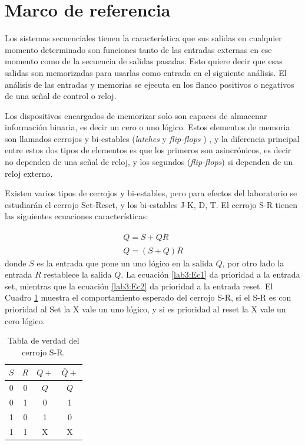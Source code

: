 \section{Marco de referencia}

 Los sistemas secuenciales tienen la característica que sus salidas en cualquier momento determinado son funciones tanto de las entradas externas en ese momento como de la secuencia de salidas pasadas. Esto quiere decir que esas salidas son memorizadas para usarlas como entrada en el siguiente análisis. El análisis de las entradas y memorias se ejecuta en los flanco positivos o negativos de una señal de control o reloj.
 
 Los dispositivos encargados de memorizar solo son capaces de almacenar información binaria, es decir un cero o uno lógico. Estos elementos de memoria son llamados cerrojos y bi-estables (\textit{latches} y \textit{flip-flops} ) , y la diferencia principal entre estos dos tipos de elementos es que los primeros son asincrónicos, es decir no dependen de una señal de reloj, y los segundos (\textit{flip-flops}) si dependen de un reloj externo. 

Existen varios tipos de cerrojos y bi-estables, pero para efectos del laboratorio se estudiarán el cerrojo Set-Reset, y los bi-estables J-K, D, T. El cerrojo S-R tienen las siguientes ecuaciones características:

\begin{eqnarray}
\label{lab3:Ec1}
Q=S+Q\bar{R} \\ \label{lab3:Ec2}
Q=(S+Q)\bar{R}
\end{eqnarray}
donde $S$ es la entrada que pone un uno lógico en la salida $Q$, por otro lado la entrada $R$ restablece la salida $Q$. La ecuación \eqref{lab3:Ec1} da prioridad a la entrada set, mientras que la ecuación \eqref{lab3:Ec2} da prioridad a la entrada reset. El Cuadro \ref{tab:SR} muestra el comportamiento esperado del cerrojo S-R, si el S-R es con prioridad al Set la X vale un uno lógico, y si es prioridad al reset la X vale un cero lógico. 

\begin{table}
	\centering
	\caption{Tabla de verdad del cerrojo S-R.}
	\label{tab:SR}
	\begin{tabular}{|c|c|c|c|}
		
		\hline 
		$S$ 	& $R$  & $Q+$  & $\bar{Q}+$  \\
		\hline 
		0	& 0 &	$Q$	&	$Q$		\\ 
		
		0	& 1&	0	&	1	\\ 
		
		1	& 0 &	1	&	0	\\ 
			
		1	& 1 &	X	&	X	\\ 	
		\hline 
	\end{tabular} 
\end{table} 


